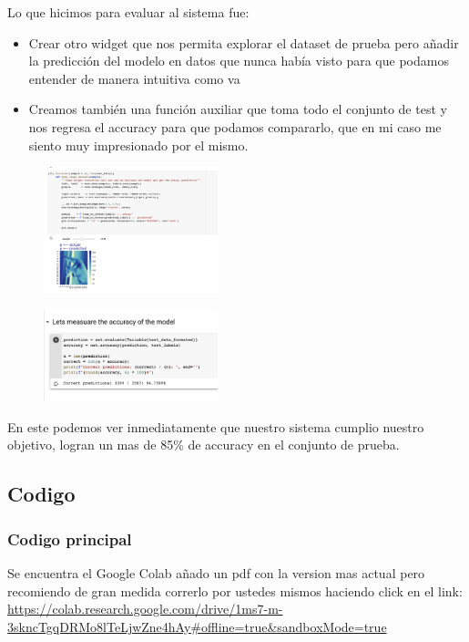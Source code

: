 \documentclass[12pt, fleqn]{report}                             %
\theoremstyle{break}                                            %
\begin{document}
        Lo que hicimos para evaluar al sistema fue:
        \begin{itemize}
            \item Crear otro widget que nos permita explorar el dataset de prueba pero añadir la predicción del modelo
            en datos que nunca había visto para que podamos entender de manera intuitiva como va
            \item Creamos también una función auxiliar que toma todo el conjunto de test y nos regresa el accuracy
            para que podamos compararlo, que en mi caso me siento muy impresionado por el mismo.
        \end{itemize}

        \begin{figure}[h!]
            \includegraphics[width=0.45\textwidth]{10}
        \end{figure}

        \begin{figure}[h!]
            \includegraphics[width=0.45\textwidth]{11}
        \end{figure}

        En este podemos ver inmediatamente que nuestro sistema cumplio nuestro objetivo, 
        logran un mas de 85\% de accuracy en el conjunto de prueba.


        \subsection{Codigo}
        \subsubsection{Codigo principal}
        Se encuentra el Google Colab añado un pdf con la version mas actual pero recomiendo de gran medida correrlo por ustedes
        mismos haciendo click en el link:
        \url{https://colab.research.google.com/drive/1ms7-m-3skncTgqDRMo8lTeLjwZne4hAy#offline=true&sandboxMode=true}
        
\end{document}
